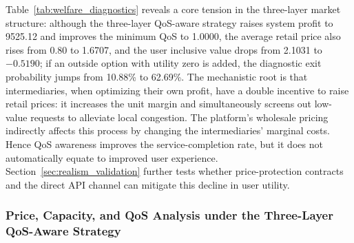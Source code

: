 \documentclass[11pt,a4paper]{article}
\begin{document}
\begin{table}[H]
\centering
\caption{User-welfare and service-quality diagnostics. The exit probability is the diagnostic value after adding an outside option with utility~0; it does not participate in baseline demand calculation.}
\label{tab:welfare_diagnostics}
\small
{}
\end{table}

Table~\ref{tab:welfare_diagnostics} reveals a core tension in the three-layer market structure: although the three-layer QoS-aware strategy raises system profit to 9525.12 and improves the minimum QoS to 1.0000, the average retail price also rises from 0.80 to 1.6707, and the user inclusive value drops from 2.1031 to $-0.5190$; if an outside option with utility zero is added, the diagnostic exit probability jumps from 10.88\% to 62.69\%. The mechanistic root is that intermediaries, when optimizing their own profit, have a double incentive to raise retail prices: it increases the unit margin and simultaneously screens out low-value requests to alleviate local congestion. The platform's wholesale pricing indirectly affects this process by changing the intermediaries' marginal costs. Hence QoS awareness improves the service-completion rate, but it does not automatically equate to improved user experience. Section~\ref{sec:realism_validation} further tests whether price-protection contracts and the direct API channel can mitigate this decline in user utility.

\subsubsection{Price, Capacity, and QoS Analysis under the Three-Layer QoS-Aware Strategy}
\label{sec:pricing_capacity_detail}
\end{document}
